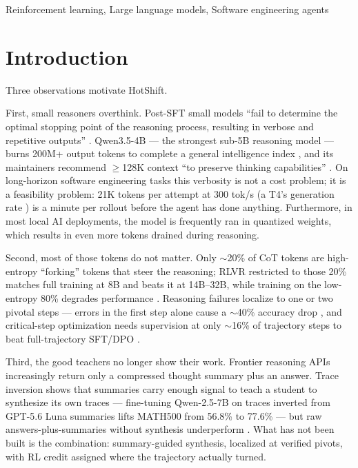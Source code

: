 \documentclass[conference]{IEEEtran}
\begin{document}
\begin{IEEEkeywords}
Reinforcement learning, Large language models, Software engineering agents
\end{IEEEkeywords}

\section{Introduction}
\label{sec:introduction}
Three observations motivate HotShift. 

First, small reasoners overthink. Post-SFT small models ``fail to determine the optimal stopping point of the reasoning process, resulting in verbose and repetitive outputs'' \cite{tldr}. Qwen3.5-4B --- the strongest sub-5B reasoning model \cite{qwen35} --- burns 200M+ output tokens to complete a general intelligence index \cite{artificialanalysis}, and its maintainers recommend $\ge$128K context ``to preserve thinking capabilities'' \cite{qwen35}. On long-horizon software engineering tasks this verbosity is not a cost problem; it is a feasibility problem: 21K tokens per attempt at 300 tok/s (a T4's generation rate \cite{unsloth}) is a minute per rollout before the agent has done anything. Furthermore, in most local AI deployments, the model is frequently ran in quantized weights, which results in even more tokens drained during reasoning.

Second, most of those tokens do not matter. Only $\sim$20\% of CoT tokens are high-entropy ``forking'' tokens that steer the reasoning; RLVR restricted to those 20\% matches full training at 8B and beats it at 14B--32B, while training on the low-entropy 80\% degrades performance \cite{wang2025}. Reasoning failures localize to one or two pivotal steps --- errors in the first step alone cause a $\sim$40\% accuracy drop \cite{liao2025}, and critical-step optimization needs supervision at only $\sim$16\% of trajectory steps to beat full-trajectory SFT/DPO \cite{cso}.

Third, the good teachers no longer show their work. Frontier reasoning APIs increasingly return only a compressed thought summary plus an answer. Trace inversion shows that summaries carry enough signal to teach a student to synthesize its own traces --- fine-tuning Qwen-2.5-7B on traces inverted from GPT-5.6 Luna summaries lifts MATH500 from 56.8\% to 77.6\% --- but raw answers-plus-summaries without synthesis underperform \cite{zhang2026}. What has not been built is the combination: summary-guided synthesis, localized at verified pivots, with RL credit assigned where the trajectory actually turned.
\end{document}
